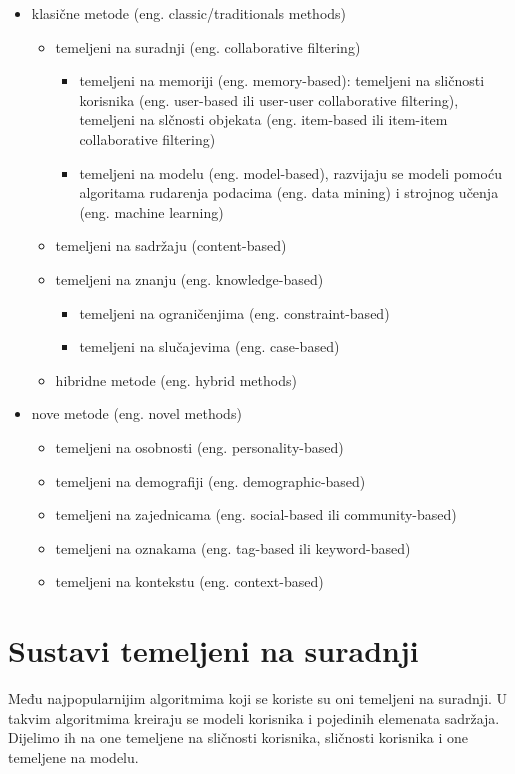 \documentclass[a4paper,oneside,12pt]{memoir} %
\begin{document}
\begin{itemize}[topsep=2pt]
\setlength{\parskip}{0pt}
\item klasične metode (eng. classic/traditionals methods)
  \begin{itemize}[topsep=2pt]
  \setlength{\parskip}{0pt}
  \item temeljeni na suradnji (eng. collaborative filtering)
    \begin{itemize}[topsep=2pt]
    \setlength{\parskip}{0pt}
    \item temeljeni na memoriji (eng. memory-based): temeljeni na sličnosti korisnika (eng. user-based ili user-user collaborative filtering), temeljeni na slčnosti objekata (eng. item-based ili item-item collaborative filtering)
    \item temeljeni na modelu (eng. model-based), razvijaju se modeli pomoću algoritama rudarenja podacima (eng. data mining) i strojnog učenja (eng. machine learning)
    \end{itemize}
  \item temeljeni na sadržaju (content-based)
  \item temeljeni na znanju (eng. knowledge-based)
    \begin{itemize}[topsep=2pt]
	\setlength{\parskip}{0pt}
    \item temeljeni na ograničenjima (eng. constraint-based)
	\item temeljeni na slučajevima (eng. case-based)
	\end{itemize}
  \item hibridne metode (eng. hybrid methods)
  \end{itemize}
\item nove metode (eng. novel methods)
    \begin{itemize}[topsep=2pt]
	\setlength{\parskip}{0pt}
    \item temeljeni na osobnosti (eng. personality-based)
    \item temeljeni na demografiji (eng. demographic-based)
    \item temeljeni na zajednicama (eng. social-based ili community-based)
    \item temeljeni na oznakama (eng. tag-based ili keyword-based)
    \item temeljeni na kontekstu (eng. context-based)
	\end{itemize}
\end{itemize}
\bigskip
\chapter{Sustavi temeljeni na suradnji}
\par Među najpopularnijim algoritmima koji se koriste su oni temeljeni na suradnji. U takvim algoritmima kreiraju se modeli korisnika i pojedinih elemenata sadržaja. Dijelimo ih na one temeljene na sličnosti korisnika, sličnosti korisnika i one temeljene na modelu.
%
\end{document}
